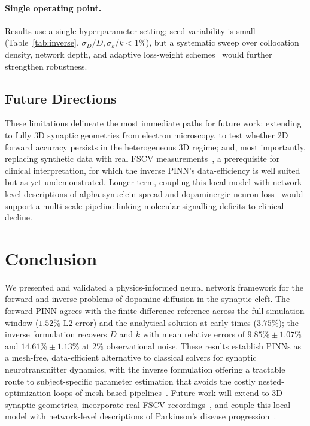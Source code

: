 \documentclass[pdflatex,sn-basic,Numbered]{sn-jnl}
\theoremstyle{thmstyleone}
\theoremstyle{thmstyletwo}
\begin{document}
\paragraph{Single operating point.}
Results use a single hyperparameter setting; seed variability is
small (Table~\ref{tab:inverse}, $\sigma_D/D, \sigma_k/k < 1\%$),
but a systematic sweep over collocation density, network depth,
and adaptive loss-weight schemes~\cite{Wang2021} would further
strengthen robustness.

\subsection{Future Directions}
\label{sec:disc_future}

These limitations delineate the most immediate paths for future
work: extending to fully 3D synaptic geometries from electron
microscopy, to test whether 2D forward accuracy persists in the
heterogeneous 3D regime; and, most importantly, replacing
synthetic data with real FSCV measurements~\cite{Rodeberg2017}, 
a prerequisite for clinical interpretation, for which the
inverse PINN's data-efficiency is well suited but as yet
undemonstrated. Longer term, coupling this local model with
network-level descriptions of alpha-synuclein spread and
dopaminergic neuron loss~\cite{Garcia2017, Corti2023,
Pandya2019} would support a multi-scale pipeline linking
molecular signalling deficits to clinical decline.

\section{Conclusion}
\label{sec:conclusion}

We presented and validated a physics-informed neural network
framework for the forward and inverse problems of dopamine
diffusion in the synaptic cleft. The forward PINN agrees with
the finite-difference reference across the full simulation
window ($1.52\%$ L2 error) and the analytical solution at early
times ($3.75\%$); the inverse formulation recovers $D$ and $k$
with mean relative errors of $9.85\% \pm 1.07\%$ and
$14.61\% \pm 1.13\%$ at $2\%$ observational noise. These results
establish PINNs as a mesh-free, data-efficient alternative to
classical solvers for synaptic neurotransmitter dynamics, with
the inverse formulation offering a tractable route to
subject-specific parameter estimation that avoids the costly
nested-optimization loops of mesh-based
pipelines~\cite{Wiencke2020}. Future work will extend to 3D
synaptic geometries, incorporate real FSCV
recordings~\cite{Rodeberg2017}, and couple this local model with
network-level descriptions of Parkinson's disease
progression~\cite{Garcia2017, Corti2023, Pandya2019}.
\end{document}
